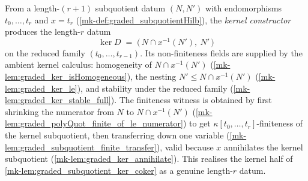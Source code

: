 \begin{definition}\label{mk-def:graded_subquotientDatum_ker}
  \leanok

  From a length-\((r+1)\) subquotient datum \((N, N')\) with endomorphisms
  \(t_0, \dots, t_r\) and \(x = t_r\) (\ref{mk-def:graded_subquotientHilb}), the
  \emph{kernel constructor} produces the length-\(r\) datum
  \[
    \ker D \;=\; \bigl(\,N \cap x^{-1}(N'),\ N'\,\bigr)
  \]
  on the reduced family \((t_0, \dots, t_{r-1})\). Its
  non-finiteness fields are supplied by the ambient kernel calculus: homogeneity of
  \(N \cap x^{-1}(N')\) (\ref{mk-lem:graded_ker_isHomogeneous}), the nesting
  \(N' \le N \cap x^{-1}(N')\) (\ref{mk-lem:graded_ker_le}), and stability under the
  reduced family (\ref{mk-lem:graded_ker_stable_full}). The finiteness witness
  is obtained by first shrinking the numerator from \(N\) to
  \(N \cap x^{-1}(N')\) (\ref{mk-lem:graded_polyQuot_finite_of_le_numerator}) to get
  \(\kappa[t_0, \dots, t_r]\)-finiteness of the kernel subquotient, then transferring
  down one variable (\ref{mk-lem:graded_subquotient_finite_transfer}), valid because
  \(x\) annihilates the kernel subquotient (\ref{mk-lem:graded_ker_annihilate}). This
  realises the kernel half of \ref{mk-lem:graded_subquotient_ker_coker} as a genuine
  length-\(r\) datum.
\end{definition}


